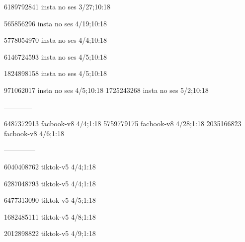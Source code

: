 6189792841 insta no ses
3/27;10:18

565856296 insta no ses
4/19;10:18

5778054970 insta no ses
4/4;10:18

6146724593 insta no ses
4/5;10:18

1824898158 insta no ses
4/5;10:18

971062017 insta no ses
4/5;10:18
1725243268 insta no ses
5/2;10:18

------------

6487372913 facbook-v8
4/4;1:18
5759779175 facbook-v8
4/28;1:18
2035166823 facbook-v8
4/6;1:18

--------------

6040408762 tiktok-v5
4/4;1:18

6287048793 tiktok-v5
4/4;1:18

6477313090 tiktok-v5
4/5;1:18

1682485111 tiktok-v5
4/8;1:18

2012898822 tiktok-v5
4/9;1:18
